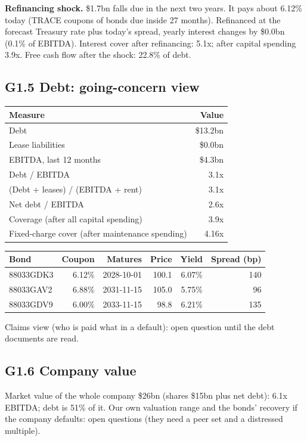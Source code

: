 \documentclass[11pt,a4paper]{article}
\begin{document}
\textbf{Refinancing shock.} \$1.7bn falls due in the next two years. It pays about 6.12\% today (TRACE coupons of bonds due inside 27 months). Refinanced at the forecast Treasury rate plus today's spread, yearly interest changes by \$0.0bn (0.1\% of EBITDA). Interest cover after refinancing: 5.1x; after capital spending 3.9x. Free cash flow after the shock: 22.8\% of debt.
\subsection*{G1.5 Debt: going-concern view}
\begin{center}\footnotesize\setlength{\tabcolsep}{3.5pt}\begin{tabular}{@{}lr@{}}\toprule
Measure & Value \\\midrule
Debt & \$13.2bn \\
Lease liabilities & \$0.0bn \\
EBITDA, last 12 months & \$4.3bn \\
Debt / EBITDA & 3.1x \\
(Debt + leases) / (EBITDA + rent) & 3.1x \\
Net debt / EBITDA & 2.6x \\
Coverage (after all capital spending) & 3.9x \\
Fixed-charge cover (after maintenance spending) & 4.16x \\
\bottomrule\end{tabular}\end{center}
\begin{center}\footnotesize\setlength{\tabcolsep}{3.5pt}\begin{tabular}{@{}lrrrrr@{}}\toprule
Bond & Coupon & Matures & Price & Yield & Spread (bp) \\\midrule
88033GDK3 & 6.12\% & 2028-10-01 & 100.1 & 6.07\% & 140 \\
88033GAV2 & 6.88\% & 2031-11-15 & 105.0 & 5.75\% & 96 \\
88033GDV9 & 6.00\% & 2033-11-15 & 98.8 & 6.21\% & 135 \\
\bottomrule\end{tabular}\end{center}
Claims view (who is paid what in a default): open question until the debt documents are read.
\subsection*{G1.6 Company value}
Market value of the whole company \$26bn (shares \$15bn plus net debt): 6.1x EBITDA; debt is 51\% of it. Our own valuation range and the bonds' recovery if the company defaults: open questions (they need a peer set and a distressed multiple).
\end{document}
